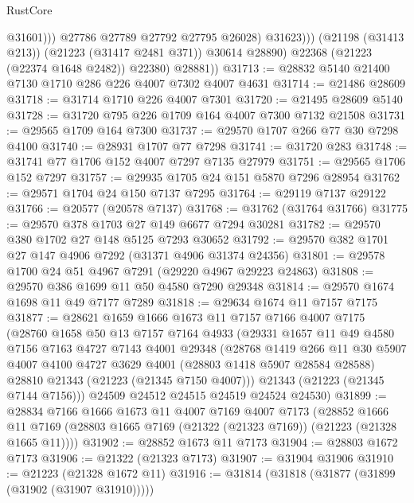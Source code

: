 \begin{lexlean}{RustCore}
\begin{coremodule}
                          @31601)))
                    @27786
                    @27789
                    @27792
                    @27795
                    @26028)
                  @31623)))
            (@21198 (@31413 @213))
            (@21223 (@31417 @2481 @371))
            @30614
            @28890)
          @22368
          (@21223 (@22374 @1648 @2482))
          @22380)
        @28881))
@31713 := @28832 @5140 @21400 @7130 @1710 @286 @226 @4007 @7302 @4007 @4631
@31714 := @21486 @28609
@31718 := @31714 @1710 @226 @4007 @7301
@31720 := @21495 @28609 @5140
@31728 := @31720 @795 @226 @1709 @164 @4007 @7300 @7132 @21508
@31731 := @29565 @1709 @164 @7300
@31737 := @29570 @1707 @266 @77 @30 @7298 @4100
@31740 := @28931 @1707 @77 @7298
@31741 := @31720 @283
@31748 := @31741 @77 @1706 @152 @4007 @7297 @7135 @27979
@31751 := @29565 @1706 @152 @7297
@31757 := @29935 @1705 @24 @151 @5870 @7296 @28954
@31762 := @29571 @1704 @24 @150 @7137 @7295
@31764 := @29119 @7137 @29122
@31766 := @20577 (@20578 @7137)
@31768 := @31762 (@31764 @31766)
@31775 := @29570 @378 @1703 @27 @149 @6677 @7294 @30281
@31782 := @29570 @380 @1702 @27 @148 @5125 @7293 @30652
@31792 := @29570 @382 @1701 @27 @147 @4906 @7292 (@31371 @4906 @31374 @24356)
@31801 := @29578 @1700 @24 @51 @4967 @7291 (@29220 @4967 @29223 @24863)
@31808 := @29570 @386 @1699 @11 @50 @4580 @7290 @29348
@31814 := @29570 @1674 @1698 @11 @49 @7177 @7289
@31818 := @29634 @1674 @11 @7157 @7175
@31877 := @28621
    @1659
    @1666
    @1673
    @11
    @7157
    @7166
    @4007
    @7175
    (@28760
      @1658
      @50
      @13
      @7157
      @7164
      @4933
      (@29331
        @1657
        @11
        @49
        @4580
        @7156
        @7163
        @4727
        @7143
        @4001
        @29348
        (@28768
          @1419
          @266
          @11
          @30
          @5907
          @4007
          @4100
          @4727
          @3629
          @4001
          (@28803 @1418 @5907 @28584 @28588)
          @28810
          @21343
          (@21223 (@21345 @7150 @4007)))
        @21343
        (@21223 (@21345 @7144 @7156)))
      @24509
      @24512
      @24515
      @24519
      @24524
      @24530)
@31899 := @28834
    @7166
    @1666
    @1673
    @11
    @4007
    @7169
    @4007
    @7173
    (@28852
      @1666
      @11
      @7169
      (@28803 @1665 @7169 (@21322 (@21323 @7169)) (@21223 (@21328 @1665 @11))))
@31902 := @28852 @1673 @11 @7173
@31904 := @28803 @1672 @7173
@31906 := @21322 (@21323 @7173)
@31907 := @31904 @31906
@31910 := @21223 (@21328 @1672 @11)
@31916 := @31814 (@31818 (@31877 (@31899 (@31902 (@31907 @31910)))))

\end{coremodule}
\end{lexlean}
